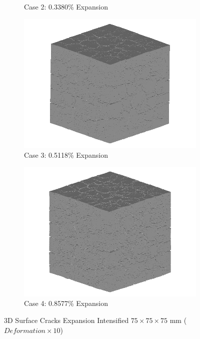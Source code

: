 \begin{figure}[!h]
\begin{subfigure}{.5\textwidth}
    \caption{Case 2: 0.3380\% Expansion}
    \end{subfigure}%
    \begin{subfigure}{.5\textwidth}
      \centering
      \includegraphics[width=.8\linewidth]{Files/exp_3D/DEF/A30X-5C_3_3d.png}
    \caption{Case 3: 0.5118\% Expansion}
    \end{subfigure}
    \begin{subfigure}{.5\textwidth}
      \centering
      \includegraphics[width=.8\linewidth]{Files/exp_3D/DEF/A30X-5C_4_3d.png}
    \caption{Case 4: 0.8577\% Expansion}
    \end{subfigure}%

  \caption{3D Surface Cracks Expansion Intensified $75 \times 75 \times 75$ mm ($Deformation \times 10$)}
  \label{fig:DEF_A30X-ss1C_3D}
\end{figure}

